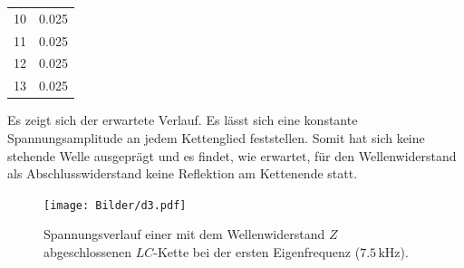 \begin{table}
\begin{tabular}{cc}
		10                      & 0.025                                                                 \\
		11                      & 0.025                                                                 \\
		12                      & 0.025                                                                 \\
		13                      & 0.025                                                                 \\
		\bottomrule
	\end{tabular}
\end{table}

Es zeigt sich der erwartete Verlauf. Es lässt sich eine konstante Spannungsamplitude an jedem Kettenglied feststellen.
Somit hat sich keine stehende Welle ausgeprägt und es findet, wie erwartet, für den Wellenwiderstand als Abschlusswiderstand keine Reflektion am Kettenende statt.


\begin{figure}
	\centering
	\texttt{[image: Bilder/d3.pdf]}
	\caption{Spannungsverlauf einer mit dem Wellenwiderstand $Z$ abgeschlossenen $LC$-Kette bei der ersten Eigenfrequenz ($7.5 \,\si{\kilo\Hz}$).}
	\label{fig:really?!}
\end{figure}
